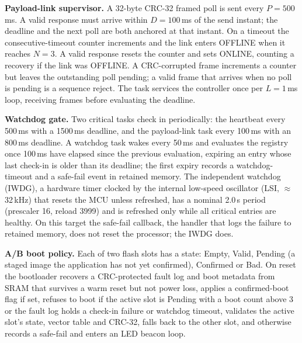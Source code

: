 \documentclass[conference,a4paper]{IEEEtran}
\begin{document}
\textbf{Payload-link supervisor.} A 32-byte CRC-32 framed poll is sent every $P=500$\,ms. A valid response must arrive within $D=100$\,ms of the send instant; the deadline and the next poll are both anchored at that instant. On a timeout the consecutive-timeout counter increments and the link enters OFFLINE when it reaches $N=3$. A valid response resets the counter and sets ONLINE, counting a recovery if the link was OFFLINE. A CRC-corrupted frame increments a counter but leaves the outstanding poll pending; a valid frame that arrives when no poll is pending is a sequence reject. The task services the controller once per $L=1$\,ms loop, receiving frames before evaluating the deadline.

\textbf{Watchdog gate.} Two critical tasks check in periodically: the heartbeat every 500\,ms with a 1500\,ms deadline, and the payload-link task every 100\,ms with an 800\,ms deadline. A watchdog task wakes every 50\,ms and evaluates the registry once 100\,ms have elapsed since the previous evaluation, expiring an entry whose last check-in is older than its deadline; the first expiry records a watchdog-timeout and a safe-fail event in retained memory. The independent watchdog (IWDG), a hardware timer clocked by the internal low-speed oscillator (LSI, $\approx$32\,kHz) that resets the MCU unless refreshed, has a nominal 2.0\,s period (prescaler 16, reload 3999) and is refreshed only while all critical entries are healthy. On this target the safe-fail callback, the handler that logs the failure to retained memory, does not reset the processor; the IWDG does.

\textbf{A/B boot policy.} Each of two flash slots has a state: Empty, Valid, Pending (a staged image the application has not yet confirmed), Confirmed or Bad. On reset the bootloader recovers a CRC-protected fault log and boot metadata from SRAM that survives a warm reset but not power loss, applies a confirmed-boot flag if set, refuses to boot if the active slot is Pending with a boot count above 3 or the fault log holds a check-in failure or watchdog timeout, validates the active slot's state, vector table and CRC-32, falls back to the other slot, and otherwise records a safe-fail and enters an LED beacon loop.
\end{document}
